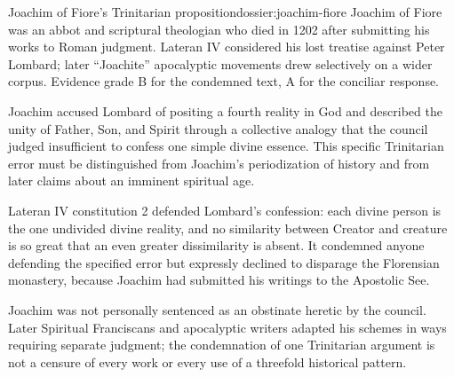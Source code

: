 \begin{heresydossier}{Joachim of Fiore's Trinitarian proposition}{dossier:joachim-fiore}
\objectfield Joachim of Fiore was an abbot and scriptural theologian who died in 1202 after submitting his works to Roman judgment. Lateran IV considered his lost treatise against Peter Lombard; later ``Joachite'' apocalyptic movements drew selectively on a wider corpus. Evidence grade B for the condemned text, A for the conciliar response.

\propositionfield Joachim accused Lombard of positing a fourth reality in God and described the unity of Father, Son, and Spirit through a collective analogy that the council judged insufficient to confess one simple divine essence. This specific Trinitarian error must be distinguished from Joachim's periodization of history and from later claims about an imminent spiritual age.

\responsefield Lateran IV constitution 2 defended Lombard's confession: each divine person is the one undivided divine reality, and no similarity between Creator and creature is so great that an even greater dissimilarity is absent. It condemned anyone defending the specified error but expressly declined to disparage the Florensian monastery, because Joachim had submitted his writings to the Apostolic See.

\aftermathfield Joachim was not personally sentenced as an obstinate heretic by the council. Later Spiritual Franciscans and apocalyptic writers adapted his schemes in ways requiring separate judgment; the condemnation of one Trinitarian argument is not a censure of every work or every use of a threefold historical pattern.
\end{heresydossier}

